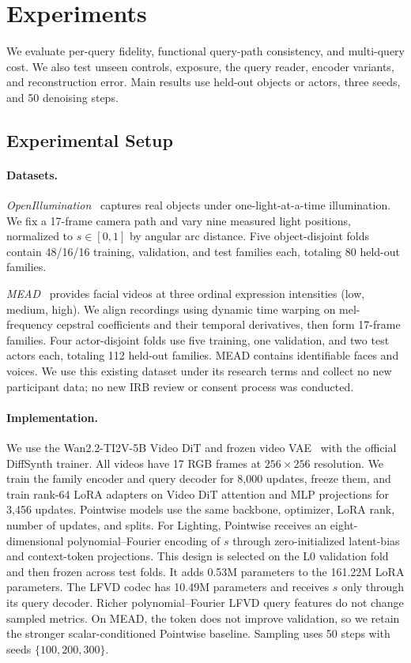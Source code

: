 
\section{Experiments}
\label{sec:experiments}

We evaluate per-query fidelity, functional query-path consistency, and
multi-query cost. We also test unseen controls, exposure, the query reader,
encoder variants, and reconstruction error. Main results use held-out objects
or actors, three seeds, and 50 denoising steps.



\subsection{Experimental Setup}

\paragraph{Datasets.}
\emph{OpenIllumination}~\cite{liu2023openillumination} captures real objects
under one-light-at-a-time illumination. We fix a 17-frame camera path and
vary nine measured light positions, normalized to $s\in[0,1]$ by angular arc
distance. Five object-disjoint folds contain 48/16/16 training, validation,
and test families each, totaling 80 held-out families.

\emph{MEAD}~\cite{wang2020mead} provides facial videos at three ordinal
expression intensities (low, medium, high). We align recordings using dynamic
time warping on mel-frequency cepstral coefficients and their temporal
derivatives, then form 17-frame families. Four actor-disjoint folds use
five training, one validation, and two test actors each, totaling 112
held-out families. MEAD contains identifiable faces and voices. We use this
existing dataset under its research terms and collect no new participant
data; no new IRB review or consent process was conducted.

\paragraph{Implementation.}
We use the Wan2.2-TI2V-5B Video DiT and frozen video
VAE~\cite{wan2025} with the official DiffSynth trainer. All videos have 17 RGB
frames at $256\times256$ resolution. We train the family encoder and query
decoder for 8,000 updates, freeze them, and train rank-64 LoRA adapters on
Video DiT attention and MLP projections for 3,456 updates. Pointwise models
use the same backbone, optimizer, LoRA rank, number of updates, and splits.
For Lighting, Pointwise receives an eight-dimensional polynomial--Fourier
encoding of $s$ through zero-initialized latent-bias and context-token
projections. This design is selected on the L0 validation fold and then frozen
across test folds. It adds 0.53M parameters to the 161.22M LoRA parameters.
The LFVD codec has 10.49M parameters and receives $s$ only through its query
decoder. Richer polynomial--Fourier LFVD query features do not change sampled
metrics. On MEAD, the token does not improve validation, so we retain the
stronger scalar-conditioned Pointwise baseline. Sampling uses 50 steps with
seeds $\{100,200,300\}$.


